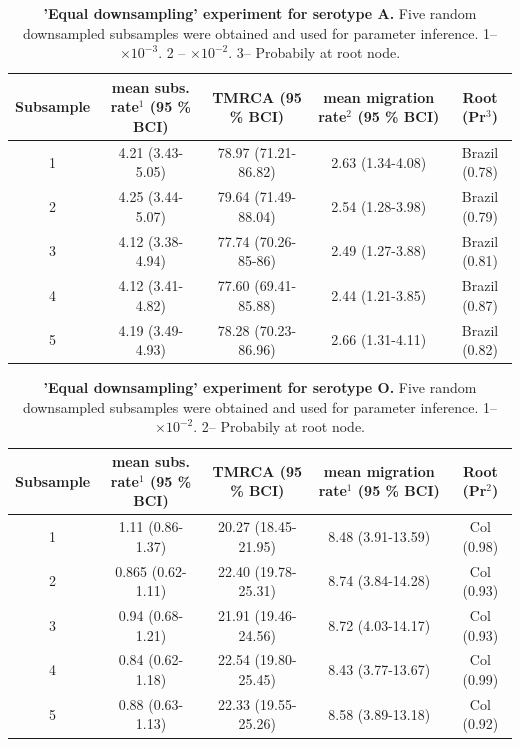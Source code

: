 \documentclass[a4paper,10pt]{article}
\begin{document}
\newpage
\begin{table}
\medskip
\begin{minipage}{\textwidth} 
\begin{center}
\caption{ {{\bf 'Equal downsampling' experiment for serotype A.}} 
Five random downsampled subsamples were obtained and used for parameter inference.
1-- $\times 10^{-3}$. 2 -- $\times 10^{-2}$. 3-- Probabily at root node.}
\begin{tabular}{ccccc}
\toprule
Subsample	&mean subs. rate$^{1}$ (95 \% BCI)	&TMRCA (95 \% BCI)	&mean migration rate$^{2}$  (95 \% BCI)	&Root (Pr$^{3}$)\\
\midrule
1	&4.21 (3.43-5.05)	&78.97 (71.21-86.82)	&2.63 (1.34-4.08)	&Brazil (0.78)\\
2	&4.25 (3.44-5.07)	&79.64 (71.49-88.04)	&2.54 (1.28-3.98)	&Brazil (0.79)\\
3	&4.12 (3.38-4.94)	&77.74 (70.26-85-86)	&2.49 (1.27-3.88)	&Brazil (0.81)\\
4	&4.12 (3.41-4.82)	&77.60 (69.41-85.88)	&2.44 (1.21-3.85)	&Brazil (0.87)\\
5	&4.19 (3.49-4.93)	&78.28 (70.23-86.96)	&2.66 (1.31-4.11)	&Brazil (0.82)\\
\bottomrule
\end{tabular}
\label{tab:ED_A}
\end{center}
\end{minipage}
\end{table}

\newpage
\begin{table}
\medskip
\begin{minipage}{\textwidth}
\begin{center}
 \caption{ {{\bf 'Equal downsampling' experiment for serotype O.}} Five random downsampled subsamples were obtained and used for parameter inference.
1-- $\times 10^{-2}$. 2--  Probabily at root node.}
\begin{tabular}{ccccc}
\toprule
Subsample	&mean subs. rate$^{1}$ (95 \% BCI)	&TMRCA (95 \% BCI)	&mean migration rate$^{1}$ (95 \% BCI)	&Root (Pr$^{2}$)\\
\midrule
1	&1.11 (0.86-1.37)	&20.27 (18.45-21.95)	&8.48 (3.91-13.59)	&Col (0.98)\\
2	&0.865 (0.62-1.11)	&22.40 (19.78-25.31)	&8.74 (3.84-14.28)	&Col (0.93)\\
3	&0.94 (0.68-1.21)	&21.91 (19.46-24.56)	&8.72 (4.03-14.17)	&Col (0.93)\\
4	&0.84 (0.62-1.18)	&22.54 (19.80-25.45)	&8.43 (3.77-13.67)	&Col (0.99)\\
5	&0.88 (0.63-1.13)	&22.33 (19.55-25.26)	&8.58 (3.89-13.18)	&Col (0.92)\\

\bottomrule
\end{tabular}
\label{tab:ED_O}
\end{center}
\end{minipage}
\end{table}
\end{document}
